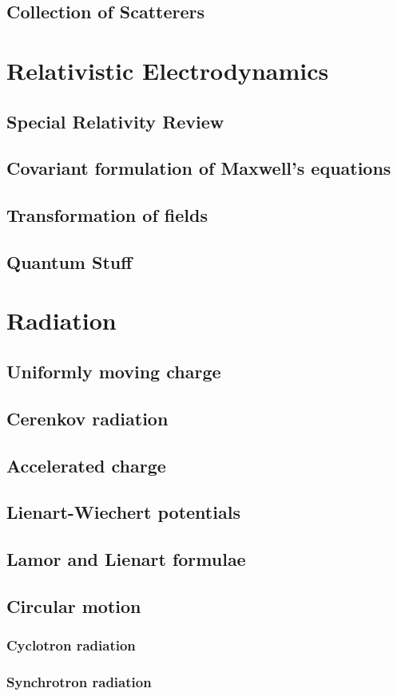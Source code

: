 \documentclass[a4paper]{article}
\theoremstyle{new}
\begin{document}
\subsection{Collection of Scatterers}

\newpage
\section{Relativistic Electrodynamics}
\subsection{Special Relativity Review}
\subsection{Covariant formulation of Maxwell's equations}
\subsection{Transformation of fields}
\subsection{Quantum Stuff}
\newpage
\section{Radiation}
\subsection{Uniformly moving charge}
\subsection{Cerenkov radiation}
\subsection{Accelerated charge}
\subsection{Lienart-Wiechert potentials}
\subsection{Lamor and Lienart formulae}
\subsection{Circular motion}
\subsubsection{Cyclotron radiation}
\subsubsection{Synchrotron radiation}
\end{document}
